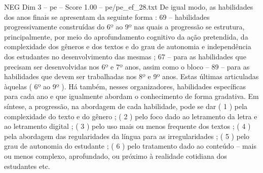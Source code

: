 \begin{textsample}{NEG Dim 3 – pe – Score 1.00 – pe/pe\_ef\_28.txt}
De igual modo, as habilidades dos anos finais se apresentam da seguinte forma : 69 – habilidades progressivamente construídas do 6º ao 9º nas quais a progressão se estrutura, principalmente, por meio do aprofundamento cognitivo da ação pretendida, da complexidade dos gêneros e dos textos e do grau de autonomia e independência dos estudantes no desenvolvimento das mesmas ; 67 – para as habilidades que precisam ser desenvolvidas nos 6º e 7º anos, assim como o bloco – 89 – para as habilidades que devem ser trabalhadas nos 8º e 9º anos.
Estas últimas articuladas àquelas ( 6º ao 9º ).
Há também, nesses organizadores, habilidades específicas para cada ano e que igualmente abordam o conhecimento de forma gradativa.
Em síntese, a progressão, na abordagem de cada habilidade, pode se dar ( 1 ) pela complexidade do texto e do gênero ; ( 2 ) pelo foco dado ao letramento da letra e ao letramento digital ; ( 3 ) pelo uso mais ou menos frequente dos textos ; ( 4 ) pela abordagem das regularidades da língua para as irregularidades ; ( 5 ) pelo grau de autonomia do estudante ; ( 6 ) pelo tratamento dado ao conteúdo – mais ou menos complexo, aprofundado, ou próximo à realidade cotidiana dos estudantes etc.

\end{textsample}
